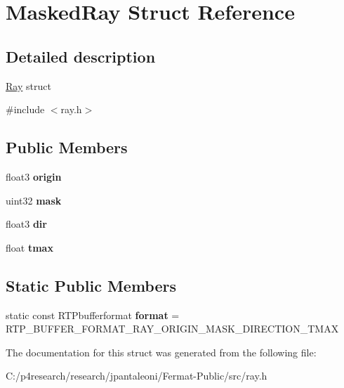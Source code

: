 \hypertarget{struct_masked_ray}{}\section{Masked\+Ray Struct Reference}
\label{struct_masked_ray}


\subsection{Detailed description}
\hyperlink{struct_ray}{Ray} struct 

{\ttfamily \#include $<$ray.\+h$>$}

\subsection*{Public Members}
\begin{DoxyCompactItemize}
\item 
\mbox{\label{struct_masked_ray_ad4927ddc49eea1ab54e823f75f678b68}} 
float3 {\bfseries origin}
\item 
\mbox{\label{struct_masked_ray_abdff0dd44246bada8ad4695ea59d6271}} 
uint32 {\bfseries mask}
\item 
\mbox{\label{struct_masked_ray_a92e575f21c2fe148c7e9d21b53a11d6d}} 
float3 {\bfseries dir}
\item 
\mbox{\label{struct_masked_ray_a796b7de0136caa6aabefeb6ffe949bf7}} 
float {\bfseries tmax}
\end{DoxyCompactItemize}
\subsection*{Static Public Members}
\begin{DoxyCompactItemize}
\item 
\mbox{\label{struct_masked_ray_a289f50cc4b9d223645bbeb5007680848}} 
static const R\+T\+Pbufferformat {\bfseries format} = R\+T\+P\+\_\+\+B\+U\+F\+F\+E\+R\+\_\+\+F\+O\+R\+M\+A\+T\+\_\+\+R\+A\+Y\+\_\+\+O\+R\+I\+G\+I\+N\+\_\+\+M\+A\+S\+K\+\_\+\+D\+I\+R\+E\+C\+T\+I\+O\+N\+\_\+\+T\+M\+AX
\end{DoxyCompactItemize}


The documentation for this struct was generated from the following file\+:\begin{DoxyCompactItemize}
\item 
C\+:/p4research/research/jpantaleoni/\+Fermat-\/\+Public/src/ray.\+h\end{DoxyCompactItemize}
